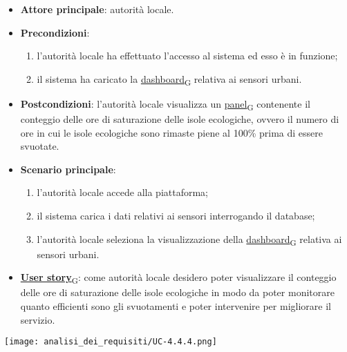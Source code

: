 \begin{itemize}
	\item \textbf{Attore principale}: autorità locale.
	\item \textbf{Precondizioni}:
	      \begin{enumerate}
		      \item l'autorità locale ha effettuato l'accesso al sistema ed esso è in funzione;
		      \item il sistema ha caricato la \href{https://7last.github.io/docs/pb/documentazione-interna/glossario\#dashboard}{dashboard\textsubscript{G}} relativa ai sensori urbani.
	      \end{enumerate}
	\item \textbf{Postcondizioni}: l'autorità locale visualizza un \href{https://7last.github.io/docs/pb/documentazione-interna/glossario\#panel}{panel\textsubscript{G}} contenente il conteggio delle ore di saturazione delle isole ecologiche,
	      ovvero il numero di ore in cui le isole ecologiche sono rimaste piene al 100\% prima di essere svuotate.
	\item \textbf{Scenario principale}:
	      \begin{enumerate}
		      \item l'autorità locale accede alla piattaforma;
		      \item il sistema carica i dati relativi ai sensori interrogando il database;
		      \item l'autorità locale seleziona la visualizzazione della \href{https://7last.github.io/docs/pb/documentazione-interna/glossario\#dashboard}{dashboard\textsubscript{G}} relativa ai sensori urbani.
	      \end{enumerate}
	\item \href{https://7last.github.io/docs/pb/documentazione-interna/glossario\#user-story}{\textbf{User story}\textsubscript{G}}:
	      come autorità locale desidero poter visualizzare il conteggio delle ore di saturazione delle isole ecologiche in modo da poter monitorare
	      quanto efficienti sono gli svuotamenti e poter intervenire per migliorare il servizio.
\end{itemize}
\begin{center}
	\texttt{[image: analisi\_dei\_requisiti/UC-4.4.4.png]}
\end{center}


